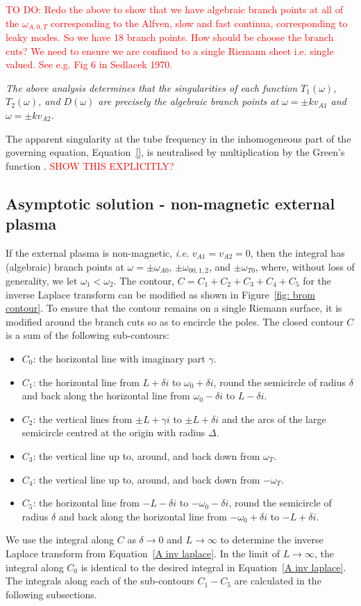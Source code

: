 \documentclass[12pt]{../style-files/ociamthesis}
\begin{document}
\textcolor{red}{TO DO: Redo the above to show that we have algebraic branch points at all of the $\omega_{A,0,T}$ corresponding to the Alfven, slow and fast continua, corresponding to leaky modes. So we have 18 branch points. How should be choose the branch cuts? We need to ensure we are confined to a single Riemann sheet i.e. single valued. See e.g. Fig 6 in Sedlacek 1970.}

\textit{The above analysis determines that the singularities of each function $T_1(\omega)$, $T_2(\omega)$, and $D(\omega)$ are precisely the algebraic branch points at $\omega = \pm kv_{A1}$ and $\omega = \pm kv_{A2}$.}

The apparent singularity at the tube frequency in the inhomogeneous part of the governing equation, Equation~\eqref{}, is neutralised by multiplication by the Green's function \citep{and_etal07}. \textcolor{red}{SHOW THIS EXPLICITLY?}

\subsection{Asymptotic solution - non-magnetic external plasma}
If the external plasma is non-magnetic, \textit{i.e.} $v_{A1} = v_{A2} = 0$, then the integral has (algebraic) branch points at $\omega = \pm \omega_{A0}$, $\pm \omega_{00,1,2}$, and $\pm \omega_{T0}$, where, without loss of generality, we let $\omega_1 < \omega_2$. The contour, $C = C_1 + C_2 + C_3 + C_4 + C_5$ for the inverse Laplace transform can be modified as shown in Figure~\ref{fig: brom contour}. To ensure that the contour remains on a single Riemann surface, it is modified around the branch cuts so as to encircle the poles. The closed contour $C$ is a sum of the following sub-contours:
\begin{itemize}
	\item $C_0$: the horizontal line with imaginary part $\gamma$.
	\item $C_1$: the horizontal line from $L + \delta i$ to $\omega_0 + \delta i$, round the semicircle of radius $\delta$ and back along the horizontal line from $\omega_0 - \delta i$ to $L - \delta i$.
	\item $C_2$: the vertical lines from $\pm L + \gamma i$ to $\pm L + \delta i$ and the arcs of the large semicircle centred at the origin with radius $\Delta$.
	\item $C_3$: the vertical line up to, around, and back down from $\omega_T$.
	\item $C_4$: the vertical line up to, around, and back down from $-\omega_T$.
	\item $C_5$: the horizontal line from $-L - \delta i$ to $-\omega_0 - \delta i$, round the semicircle of radius $\delta$ and back along the horizontal line from $-\omega_0 + \delta i$ to $-L + \delta i$.
\end{itemize}
We use the integral along $C$ as $\delta \to 0$ and $L \to \infty$ to determine the inverse Laplace transform from Equation~\eqref{A inv laplace}. In the limit of $L \to \infty$, the integral along $C_0$ is identical to the desired integral in Equation~\eqref{A inv laplace}. The integrals along each of the sub-contours $C_1 - C_5$ are calculated in the following subsections.
\end{document}
